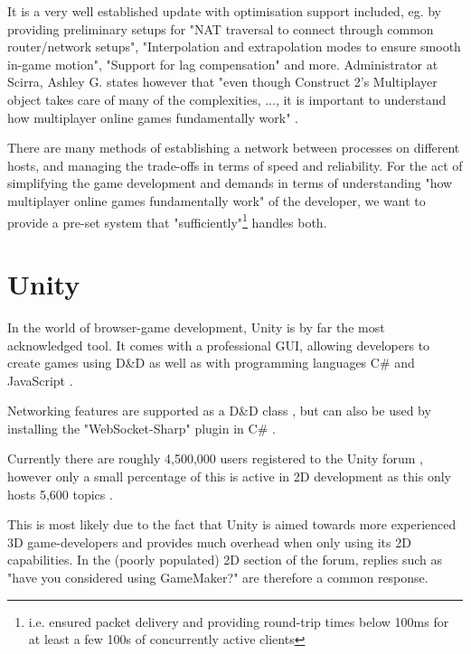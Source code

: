 \documentclass[bsc, 12pt, twoside, singlespacing, parskip, abbrevs, notimes, normalheadings, logo]{styles/infthesis}
\begin{document}
It is a very well established update with optimisation support included, eg. by providing preliminary setups for "NAT traversal to connect through common router/network setups", "Interpolation and extrapolation modes to ensure smooth in-game motion", "Support for lag compensation" and more. Administrator at Scirra, Ashley G. states however that "even though Construct 2's Multiplayer object takes care of many of the complexities, ..., it is important to understand how multiplayer online games fundamentally work" \cite{Construct2_Multiplayer_Tutorial}. 

There are many methods of establishing a network between processes on different hosts, and managing the trade-offs in terms of speed and reliability. For the act of simplifying the game development and demands in terms of understanding "how multiplayer online games fundamentally work" of the developer, we want to provide a pre-set system that "sufficiently"\footnote{i.e. ensured packet delivery and providing round-trip times below 100ms for at least a few 100s of concurrently active clients} handles both.


\section{Unity}
In the world of browser-game development, Unity is by far the most acknowledged tool. It comes with a professional GUI, allowing developers to create games using D\&D as well as with programming languages C\# and JavaScript \cite{unity_support}.

Networking features are supported as a D\&D class \cite{unity_networking}, but can also be used by installing the "WebSocket-Sharp" plugin in C\# \cite{unity_websocket_sharp}.

Currently there are roughly 4,500,000 users registered \cite{unity_stats} to the Unity forum \cite{unity_forum}, however only a small percentage of this is active in 2D development as this only hosts 5,600 topics \cite{unity_forum_2d}. 

This is most likely due to the fact that Unity is aimed towards more experienced 3D game-developers and provides much overhead when only using its 2D capabilities. In the (poorly populated) 2D section of the forum, replies such as "have you considered using GameMaker?" \cite{unity_suggests_gamemaker} are therefore a common response.
\end{document}
